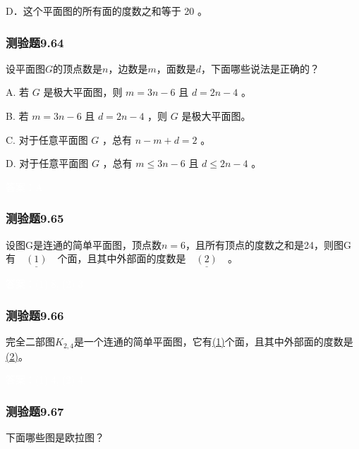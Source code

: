 \documentclass[UTF8, heading=true]{ctexart}
\begin{document}
D．这个平面图的所有面的度数之和等于 20 。

\subsubsection{测验题9.64}

设平面图$G$的顶点数是$n$，边数是$m$，面数是$d$，下面哪些说法是正确的？

A. 若 $G$ 是极大平面图，则 $m=3 n-6$ 且 $d=2 n-4$ 。

B. 若 $m=3 n-6$ 且 $d=2 n-4$ ，则 $G$ 是极大平面图。

C. 对于任意平面图 $G$ ，总有 $n-m+d=2$ 。

D. 对于任意平面图 $G$ ，总有 $m \leq 3 n-6$ 且 $d \leq 2 n-4$ 。

\textcolor{white}{答案：A}

\subsubsection{测验题9.65}

设图G是连通的简单平面图，顶点数$n = 6$，且所有顶点的度数之和是24，则图G有$\underline{\quad (1) \quad }$个面，且其中外部面的度数是$\underline{\quad (2) \quad }$。

\textcolor{white}{答案：(1) 8, (2) 3}

\subsubsection{测验题9.66}

完全二部图$K_{2,4}$是一个连通的简单平面图，它有\underline{\quad (1)\quad}个面，且其中外部面的度数是\underline{\quad (2)\quad}。

\textcolor{white}{答案：(1) 4, (2) 4}

\subsubsection{测验题9.67}

下面哪些图是欧拉图？
\end{document}
